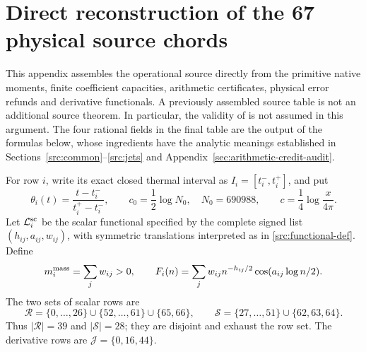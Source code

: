 \documentclass[11pt,a4paper]{article}
\theoremstyle{definition}
\theoremstyle{remark}
\begin{document}
\clearpage
\clearpage
\section{Direct reconstruction of the 67 physical source chords}
\label{app:direct-source-reconstruction}

This appendix assembles the operational source directly from the primitive
native moments, finite coefficient capacities, arithmetic certificates,
physical error refunds and derivative functionals.  A previously assembled
source table is not an additional source theorem.  In particular, the
validity of  is not assumed in this argument.
The four rational fields in the final table are the output of the formulas
below, whose ingredients have the analytic meanings established in
Sections~\ref{src:common}--\ref{src:jets} and
Appendix~\ref{sec:arithmetic-credit-audit}.

For row $i$, write its exact closed thermal interval as
$I_i=[t_i^-,t_i^+]$, and put
\[
 \theta_i(t)=\frac{t-t_i^-}{t_i^+-t_i^-},\qquad
 c_0=\frac12\log N_0,\quad N_0=690988,\qquad
 c=\frac14\log\frac{x}{4\pi}.
\]
Let $\mathcal L_i^{\rm sc}$ be the scalar functional specified by the
complete signed list $(h_{ij},a_{ij},w_{ij})$, with symmetric translations
interpreted as in \eqref{src:functional-def}.  Define
\[
 m_i^{\rm mass}=\sum_jw_{ij}>0,\qquad
 F_i(n)=\sum_jw_{ij}n^{-h_{ij}/2}
                         \cos(a_{ij}\log n/2).
\]
The two sets of scalar rows are
\[
 \mathcal R=\{0,\ldots,26\}\cup\{52,\ldots,61\}\cup\{65,66\},
 \qquad
 \mathcal S=\{27,\ldots,51\}\cup\{62,63,64\}.
\]
Thus $|\mathcal R|=39$ and $|\mathcal S|=28$; they are disjoint and
exhaust the row set.  The derivative rows are
$\mathcal J=\{0,16,44\}$.
\end{document}
